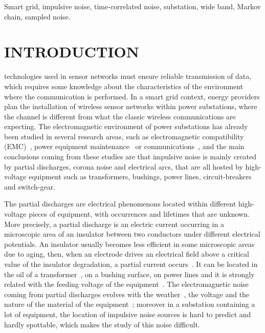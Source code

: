 \documentclass[journal]{IEEEtran}
\begin{document}
\begin{IEEEkeywords}
Smart grid, impulsive noise, time-correlated noise, substation, wide band, Markov chain, sampled noise.
\end{IEEEkeywords}



\IEEEpeerreviewmaketitle

\section{INTRODUCTION}

 technologies used in sensor networks must ensure reliable transmission of data, which requires some knowledge about the characteristics of the environment where the communication is performed. In a smart grid context, energy providers plan the installation of wireless sensor networks within power substations, where the channel is different from what the classic wireless communications are expecting. The electromagnetic environment of power substations has already been studied in several research areas, such as electromagnetic compatibility (EMC)~\cite{pakala1,pakala2}, power equipment maintenance~\cite{bart} or communications~\cite{moore1,moore2}, and the main conclusions coming from these studies are that impulsive noise is mainly created by partial discharges, corona noise and electrical arcs, that are all hosted by high-voltage equipment such as transformers, bushings, power lines, circuit-breakers and switch-gear.\

The partial discharges are electrical phenomenons located within different high-voltage pieces of equipment, with occurrences and lifetimes that are unknown. More precisely, a partial discharge is an electric current occurring in a microscopic area of an insulator between two conductors under different electrical potentials. An insulator usually becomes less efficient in some microscopic areas due to aging, then, when an electrode drives an electrical field above a critical value of the insulator degradation, a partial current occurs~\cite{bart}. It can be located in the oil of a transformer~\cite{app1}, on a bushing surface, on power lines and it is strongly related with the feeding voltage of the equipment~\cite{taiwan}. The electromagnetic noise coming from partial discharges evolves with the weather~\cite{hikita}, the voltage and the nature of the material of the equipment~\cite{taiwan}; moreover in a substation containing a lot of equipment, the location of impulsive noise sources is hard to predict and hardly spottable, which makes the study of this noise difficult.\
\end{document}
